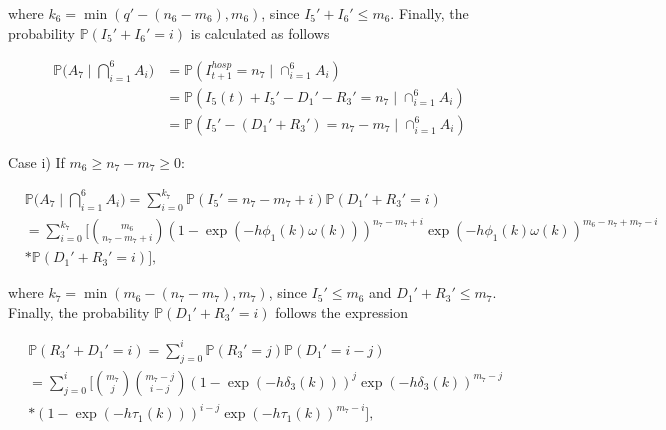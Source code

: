 \documentclass[a4paper]{article}
\theoremstyle{remark}
\begin{document}
where $k_6=\min(q'-(n_6-m_6),m_6)$, since $I_{5}'+I_{6}'\leq m_6$. Finally, the probability $\mathbb{P}(I_{5}'+I_{6}'=i)$ is calculated as follows



\hline



\begin{align*}
   \mathbb{P}\bigg(A_{7}\mid \bigcap_{i=1}^{6}A_{i}\bigg)&=\mathbb{P}(I_{t+1}^{hosp} = n_7 \mid \cap_{i=1}^{6}A_{i}) \\
   &= \mathbb{P}(I_5(t)+I_{5}'-D_{1}'-R_{3}'=n_7\mid \cap_{i=1}^{6}A_{i})\\
   &= \mathbb{P}(I_{5}'-(D_{1}'+R_{3}')=n_7-m_7\mid \cap_{i=1}^{6}A_{i})
\end{align*}

Case i) If $m_6\geq n_7-m_7\geq 0$:

\begin{equation*}
\begin{split}
&\mathbb{P}\bigg(A_{7}\mid \bigcap_{i=1}^{6}A_{i}\bigg)=\sum_{i=0}^{k_7} \mathbb{P}(I_{5}'=n_7-m_7+i)\mathbb{P}(D_{1}'+R_{3}'=i)\\
&=\sum_{i=0}^{k_7} \Bigg[{m_6 \choose n_7-m_7+i}(1-\exp(-h\phi_1(k)\omega(k)))^{n_7-m_7+i}\exp(-h\phi_1(k)\omega(k))^{m_6-n_7+m_7-i}\\
&*\mathbb{P}(D_{1}'+R_{3}'=i)\Bigg],
\end{split}
\end{equation*}


where $k_7=\min(m_6-(n_7-m_7),m_7)$, since $I_{5}'\leq m_6$ and $D_{1}'+R_{3}'\leq m_7$. Finally, the probability $\mathbb{P}(D_{1}'+R_{3}'=i)$ follows the expression

\begin{equation*}
\begin{split}
&\mathbb{P}(R_{3}'+D_{1}'=i)=\sum_{j=0}^{i} \mathbb{P}(R_{3}'=j)\mathbb{P}(D_{1}'=i-j)\\
&=\sum_{j=0}^{i}\Bigg[{m_7 \choose j}{m_7-j \choose i-j}(1-\exp(-h\delta_3(k)))^{j}\exp(-h\delta_3(k))^{m_7-j}\\
&*(1-\exp(-h\tau_1(k)))^{i-j}\exp(-h\tau_1(k))^{m_7-i}\Bigg],
\end{split}
\end{equation*}
\end{document}
